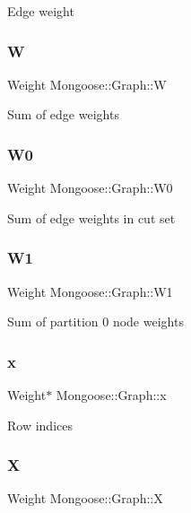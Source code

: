 Edge weight \hypertarget{class_mongoose_1_1_graph_af865ffb7d500a094501b16c4e08bf664}{}\label{class_mongoose_1_1_graph_af865ffb7d500a094501b16c4e08bf664} 
\subsubsection{\texorpdfstring{W}{W}}
{\footnotesize\ttfamily Weight Mongoose\+::\+Graph\+::W}

Sum of edge weights \hypertarget{class_mongoose_1_1_graph_af756e0f14f39b560eb8055b89ae69e36}{}\label{class_mongoose_1_1_graph_af756e0f14f39b560eb8055b89ae69e36} 
\subsubsection{\texorpdfstring{W0}{W0}}
{\footnotesize\ttfamily Weight Mongoose\+::\+Graph\+::\+W0}

Sum of edge weights in cut set \hypertarget{class_mongoose_1_1_graph_a3bcc918160fe54041c2da7d3837076de}{}\label{class_mongoose_1_1_graph_a3bcc918160fe54041c2da7d3837076de} 
\subsubsection{\texorpdfstring{W1}{W1}}
{\footnotesize\ttfamily Weight Mongoose\+::\+Graph\+::\+W1}

Sum of partition 0 node weights \hypertarget{class_mongoose_1_1_graph_a28f82cb885c3666e0d1c37a85d1b3746}{}\label{class_mongoose_1_1_graph_a28f82cb885c3666e0d1c37a85d1b3746} 
\subsubsection{\texorpdfstring{x}{x}}
{\footnotesize\ttfamily Weight$\ast$ Mongoose\+::\+Graph\+::x}

Row indices \hypertarget{class_mongoose_1_1_graph_a655fedf900671a8e6fc52f9133e71106}{}\label{class_mongoose_1_1_graph_a655fedf900671a8e6fc52f9133e71106} 
\subsubsection{\texorpdfstring{X}{X}}
{\footnotesize\ttfamily Weight Mongoose\+::\+Graph\+::X}

